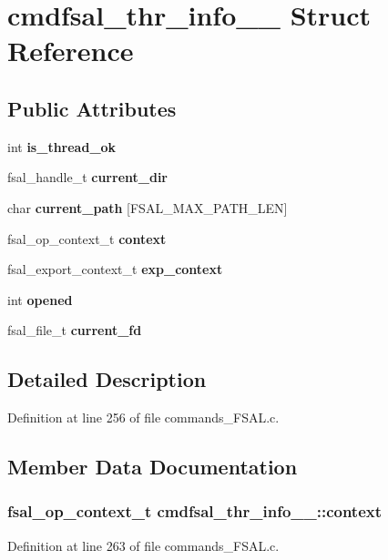\section{cmdfsal\_\-thr\_\-info\_\-\_\- Struct Reference}
\label{structcmdfsal__thr__info____}
\subsection*{Public Attributes}
\begin{DoxyCompactItemize}
\item 
int {\bf is\_\-thread\_\-ok}
\item 
fsal\_\-handle\_\-t {\bf current\_\-dir}
\item 
char {\bf current\_\-path} [FSAL\_\-MAX\_\-PATH\_\-LEN]
\item 
fsal\_\-op\_\-context\_\-t {\bf context}
\item 
fsal\_\-export\_\-context\_\-t {\bf exp\_\-context}
\item 
int {\bf opened}
\item 
fsal\_\-file\_\-t {\bf current\_\-fd}
\end{DoxyCompactItemize}


\subsection{Detailed Description}


Definition at line 256 of file commands\_\-FSAL.c.

\subsection{Member Data Documentation}
\subsubsection[{context}]{\setlength{\rightskip}{0pt plus 5cm}fsal\_\-op\_\-context\_\-t {\bf cmdfsal\_\-thr\_\-info\_\-\_\-::context}}\label{structcmdfsal__thr__info_____aaeb91047301b0b9b18a8965dd1785f69}


Definition at line 263 of file commands\_\-FSAL.c.
